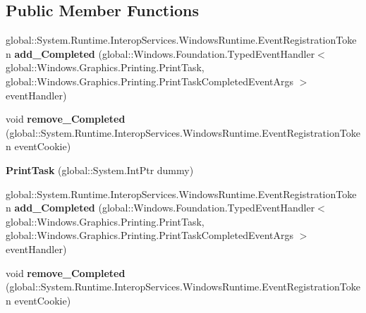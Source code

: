 \subsection*{Public Member Functions}
\begin{DoxyCompactItemize}
\item 
\mbox{\label{class_windows_1_1_graphics_1_1_printing_1_1_print_task_a017b8b87861dd7ab498c21ff1123c0fe}} 
global\+::\+System.\+Runtime.\+Interop\+Services.\+Windows\+Runtime.\+Event\+Registration\+Token {\bfseries add\+\_\+\+Completed} (global\+::\+Windows.\+Foundation.\+Typed\+Event\+Handler$<$ global\+::\+Windows.\+Graphics.\+Printing.\+Print\+Task, global\+::\+Windows.\+Graphics.\+Printing.\+Print\+Task\+Completed\+Event\+Args $>$ event\+Handler)
\item 
\mbox{\label{class_windows_1_1_graphics_1_1_printing_1_1_print_task_af8b684280a1580c00be6053e72e7badb}} 
void {\bfseries remove\+\_\+\+Completed} (global\+::\+System.\+Runtime.\+Interop\+Services.\+Windows\+Runtime.\+Event\+Registration\+Token event\+Cookie)
\item 
\mbox{\label{class_windows_1_1_graphics_1_1_printing_1_1_print_task_a96a4278842a221de2a49e30404b19e84}} 
{\bfseries Print\+Task} (global\+::\+System.\+Int\+Ptr dummy)
\item 
\mbox{\label{class_windows_1_1_graphics_1_1_printing_1_1_print_task_a017b8b87861dd7ab498c21ff1123c0fe}} 
global\+::\+System.\+Runtime.\+Interop\+Services.\+Windows\+Runtime.\+Event\+Registration\+Token {\bfseries add\+\_\+\+Completed} (global\+::\+Windows.\+Foundation.\+Typed\+Event\+Handler$<$ global\+::\+Windows.\+Graphics.\+Printing.\+Print\+Task, global\+::\+Windows.\+Graphics.\+Printing.\+Print\+Task\+Completed\+Event\+Args $>$ event\+Handler)
\item 
\mbox{\label{class_windows_1_1_graphics_1_1_printing_1_1_print_task_af8b684280a1580c00be6053e72e7badb}} 
void {\bfseries remove\+\_\+\+Completed} (global\+::\+System.\+Runtime.\+Interop\+Services.\+Windows\+Runtime.\+Event\+Registration\+Token event\+Cookie)

\end{DoxyCompactItemize}
